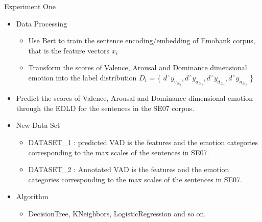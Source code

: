 \documentclass[
 size=14pt,
 paper=smartboard,  %
 mode=present, 		%
 display=slides, 	%
 style=tuliplab,  	%
 pauseslide,
 fleqn,leqno]{powerdot}
\begin{document}
\begin{slide}{Experiment One}
\begin{itemize}
\item
Data Processing

\begin{itemize}
	\item 
	Use Bert to train the sentence encoding/embedding
	of Emobank corpus, that is the feature vectors $ x_{i} $
	\item 
	Transform the scores of Valence, Arousal and Dominance 
	dimensional emotion into 
	the label distribution 
	$ D_{i} $ = \{ 
	$ d ˆ {y_{v}} _{ x_{i} } , 
	d ˆ {y_{a}} _{ x_{i} } ,
	d ˆ {y_{d}} _{ x_{i} } ,
	d ˆ {y_{n}} _{ x_{i} }  $ \}
\end{itemize}

\item 
Predict the scores of 
Valence, Arousal and Dominance dimensional emotion
through the EDLD
for the sentences in the SE07 corpus.

\item 
New Data Set

\begin{itemize}
	\item 
	DATASET_1 : predicted VAD is the features and 
	the emotion categories corresponding to 
	the max scales of the sentences in SE07.
	\item 
	DATASET_2 : Annotated VAD is the features and 
	the emotion categories corresponding to 
	the max scales of the sentences in SE07.
\end{itemize}

\item 
Algorithm

\begin{itemize}
	\item DecisionTree, KNeighbors, LogisticRegression and so on.
	
\end{itemize}
\end{itemize}

\end{slide}
\end{document}
